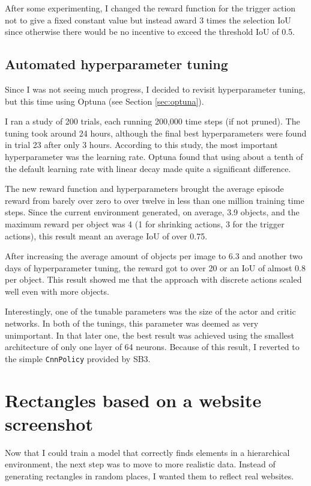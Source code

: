 \documentclass[
  digital,     %
  oneside,     %
  nosansbold,  %
  nocolorbold, %
  lof,         %
  lot,         %
]{fithesis4}
\begin{document}
After some experimenting, I changed the reward function for the trigger action not to give a fixed constant value but instead award 3 times the selection IoU since otherwise there would be no incentive to exceed the threshold IoU of 0.5.

\subsection{Automated hyperparameter tuning}

Since I was not seeing much progress, I decided to revisit hyperparameter tuning, but this time using Optuna (see Section \ref{sec:optuna}).

I ran a study of 200 trials, each running 200,000 time steps (if not pruned). The tuning took around 24 hours, although the final best hyperparameters were found in trial 23 after only 3 hours. According to this study, the most important hyperparameter was the learning rate. Optuna found that using about a tenth of the default learning rate with linear decay made quite a significant difference.

The new reward function and hyperparameters brought the average episode reward from barely over zero to over twelve in less than one million training time steps. Since the current environment generated, on average, 3.9 objects, and the maximum reward per object was 4 (1 for shrinking actions, 3 for the trigger actions), this result meant an average IoU of over 0.75.

After increasing the average amount of objects per image to 6.3 and another two days of hyperparameter tuning, the reward got to over 20 or an IoU of almost 0.8 per object. This result showed me that the approach with discrete actions scaled well even with more objects.

Interestingly, one of the tunable parameters was the size of the actor and critic networks. In both of the tunings, this parameter was deemed as very unimportant. In that later one, the best result was achieved using the smallest architecture of only one layer of 64 neurons. Because of this result, I reverted to the simple \texttt{CnnPolicy} provided by SB3.

\section{Rectangles based on a website screenshot}

Now that I could train a model that correctly finds elements in a hierarchical environment, the next step was to move to more realistic data. Instead of generating rectangles in random places, I wanted them to reflect real websites.
\end{document}
